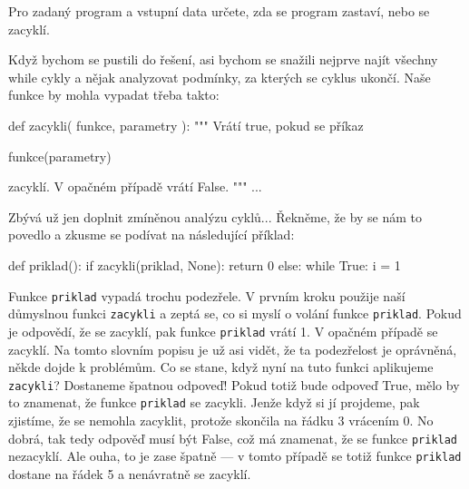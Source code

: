 \begin{uloha}\label{uloha:halting-problem} Pro zadaný program a vstupní data určete, zda se program zastaví, nebo se zacyklí.
\end{uloha}

Když bychom se pustili do řešení, asi bychom se snažili nejprve najít všechny while cykly a nějak analyzovat
podmínky, za kterých se cyklus ukončí. Naše funkce by mohla vypadat třeba takto:

\begin{python}
def zacykli( funkce, parametry ):
    """ Vrátí true, pokud se příkaz 
    
         funkce(parametry)
       
        zacyklí. V opačném případě vrátí False.
    """
    ...
\end{python}

Zbývá už jen doplnit zmíněnou analýzu cyklů... Řekněme, že by se nám to povedlo a zkusme se podívat na následující
příklad:

\begin{python}
def priklad():
    if zacykli(priklad, None):
        return 0
    else:
        while True:
          i = 1
\end{python}

Funkce {\tt priklad} vypadá trochu podezřele. V prvním kroku použije naší důmyslnou funkci {\tt zacykli} a
zeptá se, co si myslí o volání funkce {\tt priklad}. Pokud je odpovědí, že se zacyklí, pak funkce
{\tt priklad} vrátí 1. V opačném případě se zacyklí. Na tomto slovním popisu je už asi vidět, že ta
podezřelost je oprávněná, někde dojde k problémům. Co se stane, když nyní na tuto funkci aplikujeme
{\tt zacykli}? Dostaneme špatnou odpoveď! Pokud totiž bude odpoveď True, mělo by to znamenat, že funkce
{\tt priklad} se zacykli. Jenže když si jí projdeme, pak zjistíme, že se nemohla zacyklit, protože
skončila na řádku 3 vrácením 0. No dobrá, tak tedy odpověď musí být False, což má znamenat, že se
funkce {\tt priklad} nezacyklí. Ale ouha, to je zase špatně --- v tomto případě se totiž funkce {\tt priklad}
dostane na řádek 5 a nenávratně se zacyklí.












